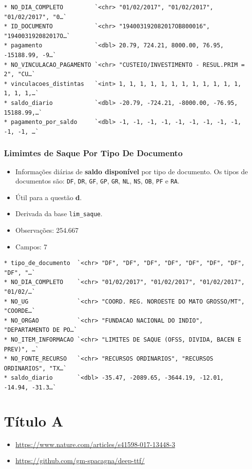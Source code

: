 \documentclass[]{book}
\providecommand{\tightlist}{%
  \setlength{\itemsep}{0pt}\setlength{\parskip}{0pt}}
\begin{document}
\begin{verbatim}
* NO_DIA_COMPLETO         `<chr> "01/02/2017", "01/02/2017", "01/02/2017", "0…`
* ID_DOCUMENTO            `<chr> "194003192082017OB800016", "194003192082017O…`
* pagamento               `<dbl> 20.79, 724.21, 8000.00, 76.95, -15188.99, -9…`
* NO_VINCULACAO_PAGAMENTO `<chr> "CUSTEIO/INVESTIMENTO - RESUL.PRIM = 2", "CU…`
* vinculacoes_distintas   `<int> 1, 1, 1, 1, 1, 1, 1, 1, 1, 1, 1, 1, 1, 1, 1,…`
* saldo_diario            `<dbl> -20.79, -724.21, -8000.00, -76.95, 15188.99,…`
* pagamento_por_saldo     `<dbl> -1, -1, -1, -1, -1, -1, -1, -1, -1, -1, -1, …`
\end{verbatim}

\hypertarget{limimtes-de-saque-por-tipo-de-documento}{%
\subsection{Limimtes de Saque Por Tipo De Documento}\label{limimtes-de-saque-por-tipo-de-documento}}

\begin{itemize}
\item
  Informações diárias de \textbf{saldo disponível} por tipo de documento. Os tipos de documentos são: \texttt{DF}, \texttt{DR}, \texttt{GF}, \texttt{GP}, \texttt{GR}, \texttt{NL}, \texttt{NS}, \texttt{OB}, \texttt{PF} e \texttt{RA}.
\item
  Útil para a questão \textbf{d}.
\item
  Derivada da base \texttt{lim\_saque}.
\item
  Observações: 254.667
\item
  Campos: 7
\end{itemize}

\begin{verbatim}
* tipo_de_documento  `<chr> "DF", "DF", "DF", "DF", "DF", "DF", "DF", "DF", "…`
* NO_DIA_COMPLETO    `<chr> "01/02/2017", "01/02/2017", "01/02/2017", "01/02/…`
* NO_UG              `<chr> "COORD. REG. NOROESTE DO MATO GROSSO/MT", "COORDE…`
* NO_ORGAO           `<chr> "FUNDACAO NACIONAL DO INDIO", "DEPARTAMENTO DE PO…`
* NO_ITEM_INFORMACAO `<chr> "LIMITES DE SAQUE (OFSS, DIVIDA, BACEN E PREV)", …`
* NO_FONTE_RECURSO   `<chr> "RECURSOS ORDINARIOS", "RECURSOS ORDINARIOS", "TX…`
* saldo_diario       `<dbl> -35.47, -2089.65, -3644.19, -12.01, -14.94, -31.3…`
\end{verbatim}

\hypertarget{tuxedtulo-a}{%
\chapter{Título A}\label{tuxedtulo-a}}

\begin{itemize}
\tightlist
\item
  \url{https://www.nature.com/articles/s41598-017-13448-3}
\item
  \url{https://github.com/gm-spacagna/deep-ttf/}
\end{itemize}


\end{document}

